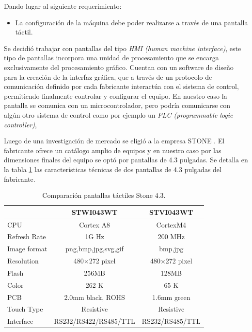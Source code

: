 Dando lugar al siguiente requerimiento:
\begin{itemize}
\item La configuración de la máquina debe poder realizarse a través de una pantalla táctil.	
\end{itemize} 

Se decidió trabajar con pantallas del tipo \textit{HMI (human machine interface)}, este tipo de pantallas incorpora una unidad de procesamiento que se encarga exclusivamente del procesamiento gráfico. Cuentan con un software de diseño para la creación de la interfaz gráfica, que a través de un protocolo de comunicación definido por cada fabricante interactúa con el sistema de control, permitiendo finalmente controlar y configurar el equipo. En nuestro caso la pantalla se comunica con un microcontrolador, pero  podría  comunicarse con algún otro sistema de control como por ejemplo un  \textit{PLC (programmable logic controller)}, 
 

Luego de una investigación de mercado se eligió a la empresa STONE \citep{web_stone}. El fabricante ofrece un catálogo amplio de equipos y en nuestro caso por las dimensiones finales del equipo se optó por pantallas de 4.3 pulgadas. Se detalla en la tabla \ref{tab:tabla_stone} las características técnicas de dos pantallas de 4.3 pulgadas del fabricante.

\begin{table}[!h]
	\centering
	\caption[Comparación Stone]{Comparación pantallas táctiles Stone 4.3.}
	\begin{tabular}{l c c }    
		\toprule
		\textbf{}     & \textbf{STWI043WT} & \textbf{STVI043WT} \\
		\midrule
		CPU 			& 	Cortex A8         		& 	CortexM4 			 	\\		
		Refresh Rate    & 	1G Hz         			& 	200 MHz 				\\
		Image format  	& 	png,bmp,jpg,svg,gif     & 	bmp,jpg 				\\
		Resolution		& 	480×272 pixel	        & 	480×272 pixel 			\\
		Flash  			& 	256MB         			& 	128MB 					\\
		Color  			& 	262 K	          		& 	65 K 					\\
		PCB 			& 	2.0mm black, ROHS       & 	1.6mm green 			\\
		Touch Type		& 	Resistive    			& 	Resistive				\\
		Interface 		& 	RS232/RS422/RS485/TTL   & 	RS232/RS485/TTL			\\
		\bottomrule
		\hline
	\end{tabular}
	\label{tab:tabla_stone}
\end{table}


